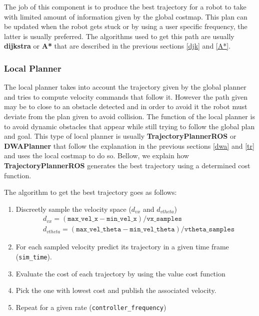 The job of this component is to produce the best trajectory for a robot to take with limited amount of information given by the global costmap.
This plan can be updated when the robot gets stuck or by using a user specific frequency, the latter is usually preferred. The algorithms used to get this path are usually \textbf{dijkstra} or \textbf{A*} that are described in the previous sections \ref{djk} and \ref{A*}.

\subsubsection{Local Planner}
The local planner takes into account the trajectory given by the global planner and tries to compute velocity commands that follow it. However the path given may be to close to an obstacle detected and in order to avoid it the robot must deviate from the plan given to avoid collision. The function of the local planner is to avoid dynamic obstacles that appear while still trying to follow the global plan and goal. This type of local planner is usually \textbf{TrajectoryPlannerROS} or \textbf{DWAPlanner} that follow the explanation in the previous sections \ref{dwa} and \ref{tr} and uses the local costmap to do so. Bellow, we explain how \textbf{TrajectoryPlannerROS} generates the best trajectory using a determined cost function.

The algorithm to get the best trajectory goes as follows:
\begin{enumerate}
    \item Discreetly sample the velocity space ($d_{vx}$ and $d_{vtheta}$)
    \begin{align*}
        & d_{vx}=(\texttt{max\_vel\_x}-\texttt{min\_vel\_x})/\texttt{vx\_samples}\\
         & d_{vtheta}=(\texttt{max\_vel\_theta}-\texttt{min\_vel\_theta})/\texttt{vtheta\_samples}
    \end{align*}
    \item For each sampled velocity predict its trajectory in a given time frame (\texttt{sim\_time}).
    \item Evaluate the cost of each trajectory  by using the value cost function
    \item Pick the one with lowest cost and publish the associated velocity.
    \item Repeat for a given rate (\texttt{controller\_frequency})
\end{enumerate}
